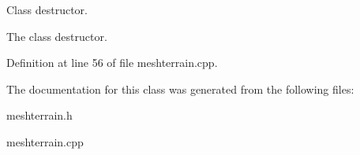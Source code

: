 Class destructor. 

The class destructor. 

Definition at line 56 of file meshterrain.cpp.



The documentation for this class was generated from the following files:\begin{DoxyCompactItemize}
\item 
meshterrain.h\item 
meshterrain.cpp\end{DoxyCompactItemize}
